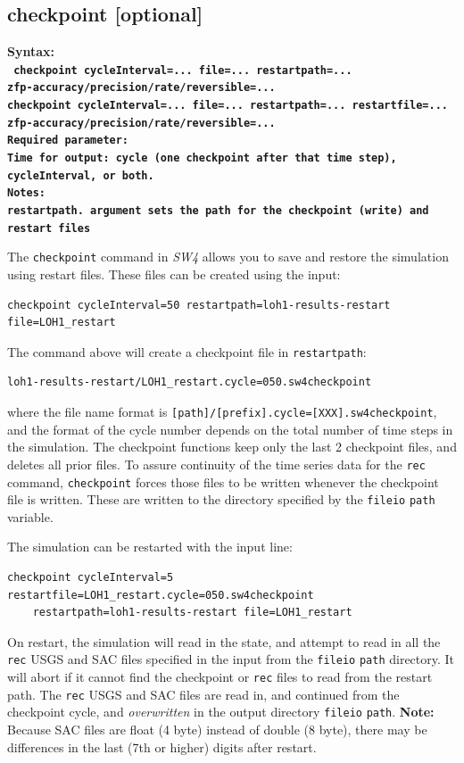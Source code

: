 \documentclass[11pt]{report}
\begin{document}
{\subsection{checkpoint [optional]}
\label{keyword:checkpoint}
\begin{flushleft}
	\bf Syntax:\\ \tt
	checkpoint cycleInterval=... file=... restartpath=... \\ zfp-{accuracy/precision/rate/reversible}=...\\
	checkpoint cycleInterval=... file=... restartpath=... restartfile=... \\
	zfp-{accuracy/precision/rate/reversible}=...\\
	\bf Required parameter:\\
	\rm Time for output: cycle (one checkpoint after that time step), cycleInterval, or both.\\
	\bf Notes:\\
	\rm \verb+restartpath+. argument sets the path for the checkpoint
	(write) and restart files
\end{flushleft}
%
The \verb+checkpoint+ command in \emph{SW4} allows you to save
and restore the simulation using restart files.
These files can be created using the input:
\begin{verbatim}
checkpoint cycleInterval=50 restartpath=loh1-results-restart file=LOH1_restart
\end{verbatim}
The command above will create a checkpoint file in \verb+restartpath+:
\begin{verbatim}
loh1-results-restart/LOH1_restart.cycle=050.sw4checkpoint
\end{verbatim}
where the file name format is {\tt [path]/[prefix].cycle=[XXX].sw4checkpoint},
and the format of the cycle number depends on the total number
of time steps in the simulation.
The checkpoint functions keep only the last 2 checkpoint files, and deletes
all prior files.
To assure continuity of the time series data for the \verb+rec+ command,
\verb+checkpoint+ forces those files to be written whenever the checkpoint
file is written.
These are written to the directory specified by the \verb+fileio+ \verb+path+
variable.

The simulation can be restarted with the input line:
\begin{verbatim}
checkpoint cycleInterval=5 restartfile=LOH1_restart.cycle=050.sw4checkpoint
    restartpath=loh1-results-restart file=LOH1_restart
\end{verbatim}
On restart, the simulation will read in the state, and attempt to
read in all the \verb+rec+ USGS and SAC files specified in the
input from the \verb+fileio+ \verb+path+ directory.
It will abort if it cannot find the checkpoint or \verb+rec+ files to read
from the restart path.
The \verb+rec+ USGS and SAC files are read in, and continued from the
checkpoint cycle, and \emph{overwritten} in the output
directory \verb+fileio+ \verb+path+.
{\bf Note:} Because SAC files are float (4 byte) instead of double (8 byte),
there may be differences in the last (7th or higher) digits after restart.

}
\end{document}
